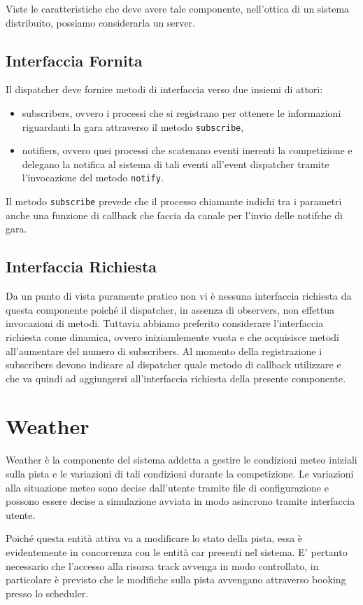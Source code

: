 \documentclass[11pt,a4paper]{report}
\newcommand{\fun}[1]{\texttt{#1}}
\begin{document}
Viste le caratteristiche che deve avere tale componente, nell'ottica di un sistema distribuito, possiamo considerarla un server.
\subsection*{Interfaccia Fornita}
Il dispatcher deve fornire metodi di interfaccia verso due insiemi di attori:
\begin{itemize}
\item subscribers, ovvero i processi che si registrano per ottenere le informazioni riguardanti la gara attraverso il metodo \fun{subscribe},
\item notifiers, ovvero quei processi che scatenano eventi inerenti la competizione e delegano la notifica al sistema di tali eventi all'event dispatcher tramite l'invocazione del metodo \fun{notify}.
\end{itemize}
Il metodo \fun{subscribe} prevede che il processo chiamante indichi tra i parametri anche una funzione di callback che faccia da canale per l'invio delle notifche di gara.

\subsection*{Interfaccia Richiesta}
Da un punto di vista puramente pratico non vi è nessuna interfaccia richiesta da questa componente poiché il dispatcher, in assenza di observers, non effettua invocazioni di metodi. Tuttavia abbiamo preferito considerare l'interfaccia richiesta come dinamica, ovvero iniziamlemente vuota e che acquisisce metodi all'aumentare del numero di subscribers. Al momento della registrazione i subscribers devono indicare al dispatcher quale metodo di callback utilizzare e che va quindi ad aggiungersi all'interfaccia richiesta della presente componente.
\section{Weather}
Weather è la componente del sistema addetta a gestire le condizioni meteo iniziali sulla pista e le variazioni di tali condizioni durante la competizione. Le variazioni alla situazione meteo sono decise dall'utente tramite file di configurazione e possono essere decise a simulazione avviata in modo asincrono tramite interfaccia utente.

Poiché questa entità attiva va a modificare lo stato della pista, essa è evidentemente in concorrenza con le entità car presenti nel sistema. E' pertanto necessario che l'accesso alla risorsa track avvenga in modo controllato, in particolare è previsto che le modifiche sulla pista avvengano attraverso booking presso lo scheduler.
\end{document}
